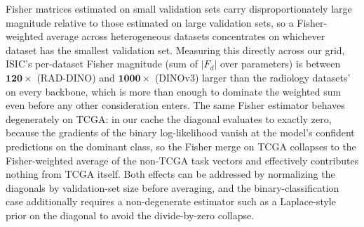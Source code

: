 \documentclass{article}
\begin{document}
Fisher matrices estimated on small validation sets carry disproportionately large magnitude relative to those estimated on large validation sets, so a Fisher-weighted average across heterogeneous datasets concentrates on whichever dataset has the smallest validation set. Measuring this directly across our grid, ISIC's per-dataset Fisher magnitude (sum of $|F_d|$ over parameters) is between $\mathbf{120\times}$ (RAD-DINO) and $\mathbf{1000\times}$ (DINOv3) larger than the radiology datasets' on every backbone, which is more than enough to dominate the weighted sum even before any other consideration enters. The same Fisher estimator behaves degenerately on TCGA: in our cache the diagonal evaluates to exactly zero, because the gradients of the binary log-likelihood vanish at the model's confident predictions on the dominant class, so the Fisher merge on TCGA collapses to the Fisher-weighted average of the non-TCGA task vectors and effectively contributes nothing from TCGA itself. Both effects can be addressed by normalizing the diagonals by validation-set size before averaging, and the binary-classification case additionally requires a non-degenerate estimator such as a Laplace-style prior on the diagonal to avoid the divide-by-zero collapse.
\end{document}
